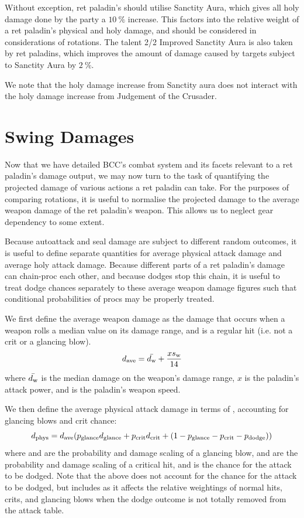 \documentclass[letterpaper,11pt]{article}
\begin{document}
	Without exception, ret paladin's should utilise Sanctity Aura, which gives all holy damage done by the party a $10~\%$ increase.
	This factors into the relative weight of a ret paladin's physical and holy damage, and should be considered in considerations of rotations.
	The talent 2/2 Improved Sanctity Aura is also taken by ret paladins, which improves the amount of damage caused by targets subject to Sanctity Aura by $2~\%$.
	
	We note that the holy damage increase from Sanctity aura does not interact with the holy damage increase from Judgement of the Crusader.
	
	\section{Swing Damages}
	Now that we have detailed BCC's combat system and its facets relevant to a ret paladin's damage output, we may now turn to the task of quantifying the projected damage of various actions a ret paladin can take. For the purposes of comparing rotations, it is useful to normalise the projected damage to the average weapon damage of the ret paladin's weapon. This allows us to neglect gear dependency to some extent.
	
	Because autoattack and seal damage are subject to different random outcomes, it is useful to define separate quantities for average physical attack damage and average holy attack damage.
	Because different parts of a ret paladin's damage can chain-proc each other, and because dodges stop this chain, it is useful to treat dodge chances separately to these average weapon damage figures such that conditional probabilities of procs may be properly treated.
	
	We first define the average weapon damage as the damage that occurs when a weapon rolls a median value on its damage range, and is a regular hit (i.e. not a crit or a glancing blow).
	\begin{equation}
		d_{\mathrm{ave}}  = \bar{d_\mathrm{w} } + \frac{xs_\mathrm{w} }{14}
	\end{equation}
	where $\bar{d_\mathrm{w} }$ is the median damage on the weapon's damage range, $x$ is the paladin's attack power, and \ws is the paladin's weapon speed.
	
	We then define the average physical attack damage in terms of \dave, accounting for glancing blows and crit chance:
	\begin{equation}
		d_{\mathrm{phys}}  = d_{\mathrm{ave}}  (p_{\mathrm{glance}}  d_{\mathrm{glance}}  + p_{\mathrm{crit}}  d_{\mathrm{crit}}  + (1 - p_{\mathrm{glance}}  - p_{\mathrm{crit}}  - p_{\mathrm{dodge}} ))
	\end{equation}
	where \pglance and \dglance are the probability and damage scaling of a glancing blow, \pcrit and \dcrit are the probability and damage scaling of a critical hit, and \pdodge is the chance for the attack to be dodged.
	Note that the above does not account for the chance for the attack to be dodged, but includes \pdodge as it affects the relative weightings of normal hits, crits, and glancing blows when the dodge outcome is not totally removed from the attack table.
	
\end{document}
